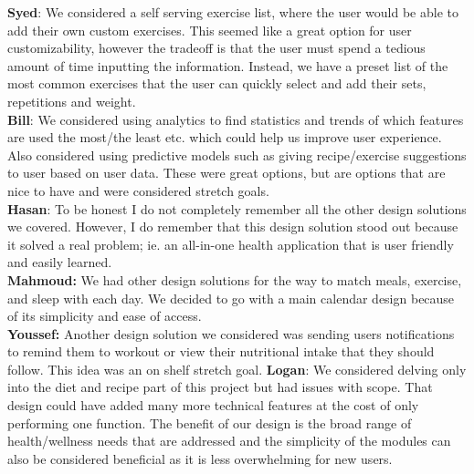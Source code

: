 \documentclass[12pt, titlepage]{article}
\begin{document}
\begin{enumerate}
	\textbf{Syed}: We considered a self serving exercise list, where the user would be able to add their own custom exercises. This seemed like a great option for user customizability, however the tradeoff is that the user must spend a tedious amount of time inputting the information. Instead, we have a preset list of the most common exercises that the user can quickly select and add their sets, repetitions and weight. \\
	\textbf{Bill}: We considered using analytics to find statistics and trends of which features are used the most/the least etc. which could help us improve user experience. Also considered using predictive models such as giving recipe/exercise suggestions to user based on user data. These were great options, but are options that are nice to have and were considered stretch goals. \\
	\textbf{Hasan}: To be honest I do not completely remember all the other design solutions we covered. However, I do remember that this design solution stood out because it solved a real problem; ie. an all-in-one health application that is user friendly and easily learned. \\
	\textbf{Mahmoud:} We had other design solutions for the way to match meals, exercise, and sleep with each day. We decided to go with a main calendar design because of its simplicity and ease of access. \\
	\textbf{Youssef:} Another design solution we considered was sending users notifications to remind them to workout or view their nutritional intake that they should follow. This idea was an on shelf stretch goal.
    \textbf{Logan}: We considered delving only into the diet and recipe part of this project but had issues with scope. That design could have added many more technical features at the cost of only performing one function. The benefit of our design is the broad range of health/wellness needs that are addressed and the simplicity of the modules can also be considered beneficial as it is less overwhelming for new users.
\end{enumerate}
\end{document}

